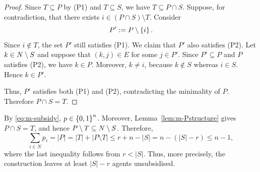 \begin{proof}
Since $T\subseteq P$ by \textnormal{(P1)} and $T\subseteq S$, we have $T\subseteq P\cap S$. Suppose, for contradiction, that there exists $i\in (P\cap S)\setminus T$. Consider
\[
    P':=P\setminus\left\{i\right\}.
\]
Since $i\notin T$, the set $P'$ still satisfies \textnormal{(P1)}. We claim that $P'$ also satisfies \textnormal{(P2)}. Let $k\in N\setminus S$ and suppose that $(k,j)\in E$ for some $j\in P'$. Since $P'\subseteq P$ and $P$ satisfies \textnormal{(P2)}, we have $k\in P$. Moreover, $k\neq i$, because $k\notin S$ whereas $i\in S$. Hence $k\in P'$.

Thus, $P'$ satisfies both \textnormal{(P1)} and \textnormal{(P2)}, contradicting the minimality of $P$. Therefore $P\cap S=T$.
\end{proof}










By \eqref{eq:m-subsidy}, $p\in\left\{0,1\right\}^n$. Moreover, Lemma~\ref{lem:m-Pstructure} gives $P\cap S=T$, and hence $P\setminus T\subseteq N\setminus S$. Therefore,
\begin{equation}
\label{eq_1}
\sum_{i\in N}p_i
 = |P|
 = |T|+|P\setminus T|
 \le r+n-|S|
 = n-(|S|-r)
 \le n-1,
\end{equation}
where the last inequality follows from $r<|S|$. Thus, more precisely, the construction leaves at least $|S|-r$ agents unsubsidised.





